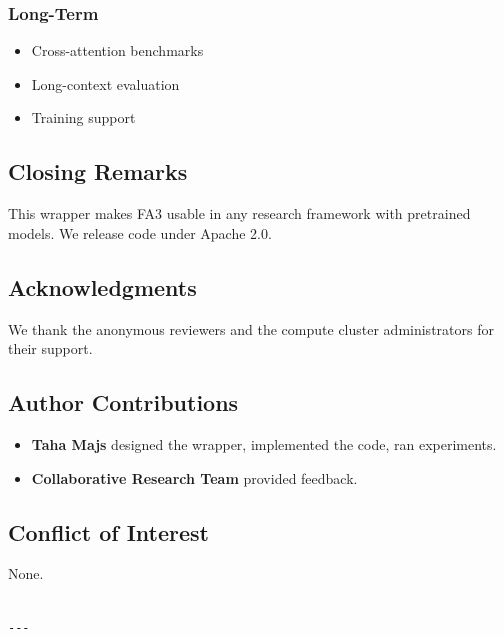 \subsubsection{Long-Term}
\begin{itemize}
\item Cross-attention benchmarks
\item Long-context evaluation
\item Training support

\end{itemize}
\subsection{Closing Remarks}

This wrapper makes FA3 usable in any research framework with pretrained 
models. We release code under Apache 2.0.

\subsection{Acknowledgments}

We thank the anonymous reviewers and the compute cluster administrators for their support.

\subsection{Author Contributions}

\begin{itemize}
\item \textbf{Taha Majs} designed the wrapper, implemented the code, ran experiments.
\item \textbf{Collaborative Research Team} provided feedback.

\end{itemize}
\subsection{Conflict of Interest}

None.
\begin{lstlisting}

---
\end{lstlisting}